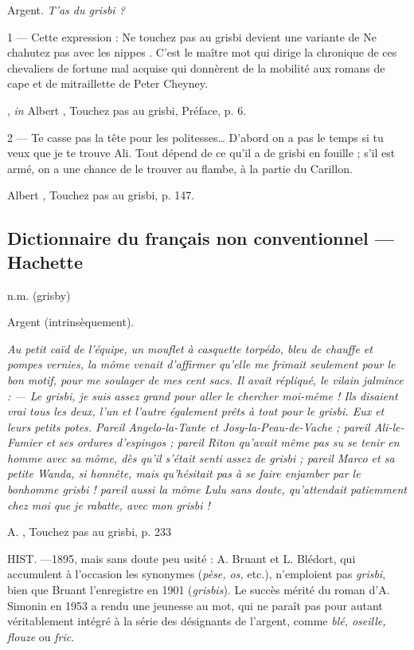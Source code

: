  Argent. \emph{T'as du grisbi ?}

1 --- Cette expression : \og Ne touchez pas au grisbi \fg{} devient une variante de \og Ne chahutez pas avec les nippes \fg{}. C'est le maître mot qui dirige la chronique de ces chevaliers de fortune mal acquise qui donnèrent de la mobilité aux romans de cape et de mitraillette de Peter Cheyney.

			, \emph{in} Albert , Touchez pas au grisbi, Préface, p. 6.

2 --- \og Te casse pas la tête pour les politesses\ldots{ } D'abord on a pas le temps si tu veux que je te trouve Ali. Tout dépend de ce qu'il a de grisbi en fouille ; s'il est armé, on a une chance de le trouver au flambe, à la partie du Carillon.\fg{}

			Albert , Touchez pas au grisbi, p. 147.


\subsection*{Dictionnaire du français non conventionnel --- Hachette}

n.m. (grisby)

Argent (intrinsèquement).

\emph{Au petit caïd de l'équipe, un mouflet à casquette torpédo, bleu de
chauffe et pompes vernies, la môme venait d'affirmer qu'elle me frimait
seulement pour le bon motif, pour me soulager de mes cent sacs. Il avait
répliqué, le vilain jalmince :
--- Le \emph{grisbi}, je suis assez grand pour aller le chercher moi-même !
Ils disaient vrai tous les deux, l'un et l'autre également prêts à tout pour le
\emph{grisbi}. Eux et leurs petits potes. Pareil Angelo-la-Tante et
Josy-la-Peau-de-Vache ; pareil Ali-le-Fumier et ses ordures d'espingos ;
pareil Riton qu'avait même pas su se tenir en homme avec sa môme, dès qu'il
s'était senti assez de \emph{grisbi} ; pareil Marco et sa petite Wanda, si
honnête, mais qu'hésitait pas à se faire enjamber par le bonhomme \emph{grisbi} ! pareil aussi la môme Lulu sans doute, qu'attendait patiemment chez moi que je rabatte, avec mon \emph{grisbi} !}

			A. , Touchez pas au grisbi, p. 233

HIST. ---1895, mais sans doute peu usité : A. Bruant et L. Blédort, qui
accumulent à l'occasion les synonymes (\emph{pèse, os,} etc.), n'emploient pas \emph{grisbi}, bien que Bruant l'enregistre en 1901 (\emph{grisbis}). Le succès mérité du roman d'A. Simonin en 1953 a rendu une jeunesse au mot, qui ne paraît pas pour autant véritablement intégré à la série des désignants de l'argent, comme \emph{blé, oseille, flouze} ou \emph{fric}.

